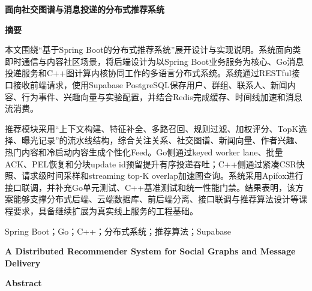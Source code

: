 
\clearpage
\thispagestyle{abstractcn}

\vspace*{1.15cm}

\begin{center}
  {\heiti\bfseries{} 面向社交图谱与消息投递的分布式推荐系统\par}
  \vspace{0.55cm}
  {\heiti\bfseries{} 摘\quad 要\par}
\end{center}

\vspace{0.25cm}

{\songti{}\setlength{\parindent}{2em}\linespread{1.65}\selectfont
  本文围绕“基于Spring Boot的分布式推荐系统”展开设计与实现说明。系统面向类即时通信与内容社区场景，将后端设计为以Spring Boot业务服务为核心、Go消息投递服务和C++图计算内核协同工作的多语言分布式系统。系统通过RESTful接口接收前端请求，使用Supabase PostgreSQL保存用户、群组、联系人、新闻内容、行为事件、兴趣向量与实验配置，并结合Redis完成缓存、时间线加速和消息流消费。

  推荐模块采用“上下文构建、特征补全、多路召回、规则过滤、加权评分、TopK选择、曝光记录”的流水线结构，综合关注关系、社交图谱、新闻向量、作者兴趣、热门内容和冷启动内容生成个性化Feed。Go侧通过keyed worker lane、批量ACK、PEL恢复和分块update id预留提升有序投递吞吐；C++侧通过紧凑CSR快照、请求级时间采样和streaming top-K overlap加速图查询。系统采用Apifox进行接口联调，并补充Go单元测试、C++基准测试和统一性能门禁。结果表明，该方案能够支撑分布式后端、云端数据库、前后端分离、接口联调与推荐算法设计等课程要求，具备继续扩展为真实线上服务的工程基础。

  \vspace{0.65cm}
  Spring Boot；Go；C++；分布式系统；推荐算法；Supabase
  \par}

\clearpage
\thispagestyle{abstracten}

\vspace*{0.9cm}

\begin{center}
  {\rmfamily\bfseries{} A Distributed Recommender System for Social Graphs and Message Delivery\par}
  \vspace{0.45cm}
  {\rmfamily\bfseries{} Abstract\par}
\end{center}

